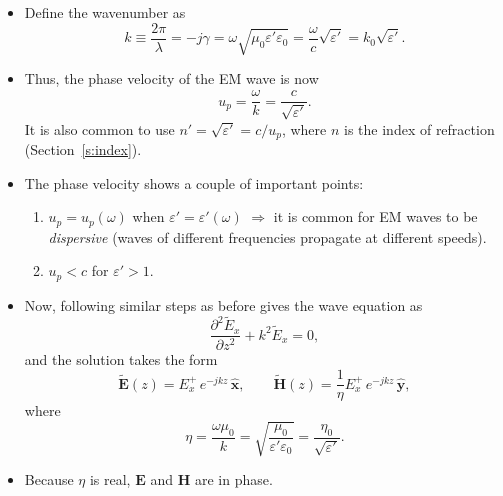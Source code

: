 \documentclass[11pt, oneside]{article}
\begin{document}
\begin{itemize}
	\item Define the wavenumber as
	\begin{equation}
		k \equiv \frac{2\pi}{\lambda} = -j\gamma = \omega\sqrt{\mu_0\varepsilon'\varepsilon_0} = \frac{\omega}{c}\sqrt{\varepsilon'} = k_0\sqrt{\varepsilon'}.
	\end{equation}
	\item Thus, the phase velocity of the EM wave is now
	\begin{equation}
		u_p = \frac{\omega}{k} = \frac{c}{\sqrt{\varepsilon'}}.
	\end{equation}
	It is also common to use $n' = \sqrt{\varepsilon'} = c/u_p$, where $n$ is the index of refraction (Section~\ref{s:index}).
	\item The phase velocity shows a couple of important points:
	\begin{enumerate}
		\item $u_p = u_p(\omega)$ when $\varepsilon' = \varepsilon'(\omega)$ $\Rightarrow$ it is common for EM waves to be \emph{dispersive} (waves of different frequencies propagate at different speeds).
		\item $u_p < c$ for $\varepsilon' > 1$.
	\end{enumerate}
	\item Now, following similar steps as before gives the wave equation as
	\begin{equation}
		\frac{\partial^2 \tilde{E}_x}{\partial z^2} + k^2\tilde{E}_x = 0,
	\end{equation}
	and the solution takes the form
	\begin{equation}
		\label{e:plane_lossless}
		\tilde{\mathbf{E}}(z) = E_x^+\,e^{-jkz}\,\hat{\mathbf{x}},
		\qquad
		\tilde{\mathbf{H}}(z) = \frac{1}{\eta}E_x^+\,e^{-jkz}\,\hat{\mathbf{y}},
	\end{equation}
	where
	\begin{equation}
		\eta = \frac{\omega\mu_0}{k} = \sqrt{\frac{\mu_0}{\varepsilon'\varepsilon_0}} = \frac{\eta_0}{\sqrt{\varepsilon'}}.
	\end{equation}
	\item[$\bigstar$] Because $\eta$ is real, $\mathbf{E}$ and $\mathbf{H}$ are in phase.
\end{itemize}
\end{document}
